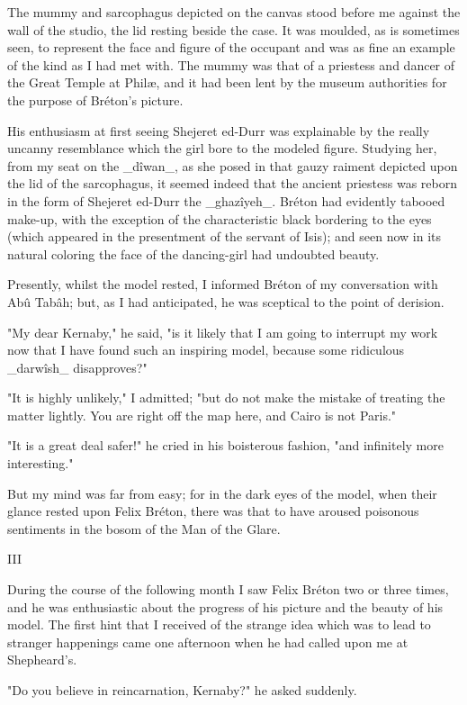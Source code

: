 The mummy and sarcophagus depicted on the canvas stood before me
against the wall of the studio, the lid resting beside the case. It
was moulded, as is sometimes seen, to represent the face and figure of
the occupant and was as fine an example of the kind as I had met with.
The mummy was that of a priestess and dancer of the Great Temple at
Philæ, and it had been lent by the museum authorities for the purpose
of Bréton's picture.

His enthusiasm at first seeing Shejeret ed-Durr was explainable by the
really uncanny resemblance which the girl bore to the modeled figure.
Studying her, from my seat on the _dîwan_, as she posed in that gauzy
raiment depicted upon the lid of the sarcophagus, it seemed indeed
that the ancient priestess was reborn in the form of Shejeret ed-Durr
the _ghazîyeh_. Bréton had evidently tabooed make-up, with the
exception of the characteristic black bordering to the eyes (which
appeared in the presentment of the servant of Isis); and seen now in
its natural coloring the face of the dancing-girl had undoubted
beauty.

Presently, whilst the model rested, I informed Bréton of my
conversation with Abû Tabâh; but, as I had anticipated, he was
sceptical to the point of derision.

"My dear Kernaby," he said, "is it likely that I am going to interrupt
my work now that I have found such an inspiring model, because some
ridiculous _darwîsh_ disapproves?"

"It is highly unlikely," I admitted; "but do not make the mistake of
treating the matter lightly. You are right off the map here, and Cairo
is not Paris."

"It is a great deal safer!" he cried in his boisterous fashion, "and
infinitely more interesting."

But my mind was far from easy; for in the dark eyes of the model, when
their glance rested upon Felix Bréton, there was that to have aroused
poisonous sentiments in the bosom of the Man of the Glare.


III

During the course of the following month I saw Felix Bréton two or
three times, and he was enthusiastic about the progress of his picture
and the beauty of his model. The first hint that I received of the
strange idea which was to lead to stranger happenings came one
afternoon when he had called upon me at Shepheard's.

"Do you believe in reincarnation, Kernaby?" he asked suddenly.

